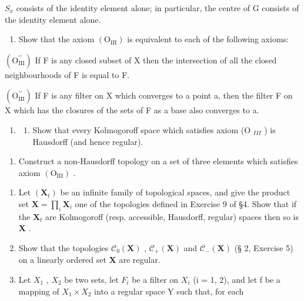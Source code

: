 \(S_{x}\) consists of the identity element alone; in particular, the centre of G consists of the identity element alone.

\begin{enumerate}
\def\labelenumi{\arabic{enumi})}
\setcounter{enumi}{13}
\tightlist
\item
  Show that the axiom \((\mathrm{O}_{\mathrm{III}})\) is equivalent to each of the following axioms:
\end{enumerate}

\((\mathrm{O}_{\mathrm{III}}^{\prime\prime})\) If F is any closed subset of X then the intersection of all the closed neighbourhoods of F is equal to F.

\((\mathrm{O}_{\mathrm{III}}^{\prime\prime})\) If F is any filter on X which converges to a point a, then the filter F on X which has the closures of the sets of F as a base also converges to a.

\begin{enumerate}
\def\labelenumi{\arabic{enumi})}
\setcounter{enumi}{14}
\tightlist
\item
  \begin{enumerate}
  \def\labelenumii{\alph{enumii})}
  \tightlist
  \item
    Show that every Kolmogoroff space which satisfies axiom (O \(_{III}\) ) is Hausdorff (and hence regular).
  \end{enumerate}
\end{enumerate}

\begin{enumerate}
\def\labelenumi{\alph{enumi})}
\setcounter{enumi}{1}
\tightlist
\item
  Construct a non-Hausdorff topology on a set of three elements which satisfies axiom \((\mathrm{O}_{\mathrm{III}})\) .
\end{enumerate}

\begin{enumerate}
\def\labelenumi{\arabic{enumi})}
\setcounter{enumi}{15}
\item
  Let \((\mathbf{X}_t)\) be an infinite family of topological spaces, and give the product set \(\mathbf{X} = \prod_{i} \mathbf{X}_i\) one of the topologies defined in Exercise 9 of §4. Show that if the \(\mathbf{X}_t\) are Kolmogoroff (resp. accessible, Hausdorff, regular) spaces then so is \(\mathbf{X}\) .
\item
  Show that the topologies \(\mathcal{C}_0(\mathbf{X})\) , \(\mathcal{C}_+(\mathbf{X})\) and \(\mathcal{C}_{-}(\mathbf{X})\) (§ 2, Exercise 5) on a linearly ordered set \(\mathbf{X}\) are regular.
\item
  Let \(X_{1}\) , \(X_{2}\) be two sets, let \(F_{i}\) be a filter on \(X_{i}\) (i = 1, 2), and let f be a mapping of \(X_{1} \times X_{2}\) into a regular space Y such that, for each
\end{enumerate}

